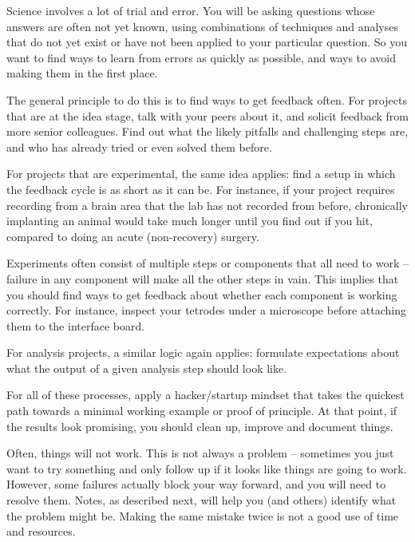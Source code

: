 \documentclass{tufte-book}
\begin{document}
Science involves a lot of trial and error. You will be asking
questions whose answers are often not yet known, using combinations of
techniques and analyses that do not yet exist or have not been applied
to your particular question. So you want to find ways to learn from
errors as quickly as possible, and ways to avoid making them in the
first place.

The general principle to do this is to find ways to get feedback
often. For projects that are at the idea stage, talk with your peers
about it, and solicit feedback from more senior colleagues. Find out
what the likely pitfalls and challenging steps are, and who has
already tried or even solved them before.

For projects that are experimental, the same idea applies: find a
setup in which the feedback cycle is as short as it can be. For
instance, if your project requires recording from a brain area that
the lab has not recorded from before, chronically implanting an animal
would take much longer until you find out if you hit, compared to
doing an acute (non-recovery) surgery.

Experiments often consist of multiple steps or components that all
need to work -- failure in any component will make all the other steps
in vain. This implies
that you should find ways to get feedback about whether each component
is working correctly. For instance, inspect your tetrodes under a
microscope before attaching them to the interface board.

For analysis projects, a similar logic again applies: formulate
expectations about what the output of a given analysis step should
look like. 

For all of these processes, apply a hacker/startup mindset that takes
the quickest path towards a minimal working example or proof of
principle. At that point, if the results look promising, you should
clean up, improve and document things.

Often, things will not work. This is not always a problem -- sometimes
you just want to try something and only follow up if it looks like
things are going to work. However, some failures actually block your
way forward, and you will need to resolve them. Notes, as described
next, will help you (and others) identify what the problem might
be. Making the same mistake twice is not a good use of time and
resources.
\end{document}
